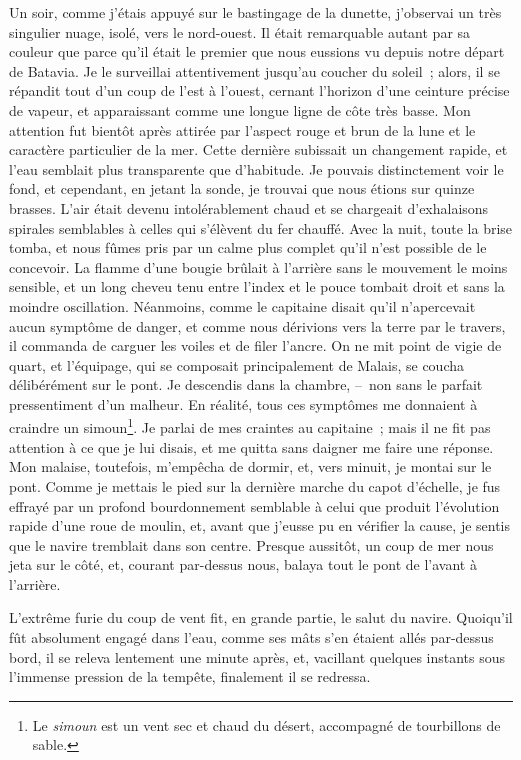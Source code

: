 \documentclass[french,twoside]{book} %
\begin{document}
Un soir, comme j’étais appuyé sur le bastingage de la dunette, j’observai un très singulier nuage, isolé, vers le nord-ouest. Il était remarquable autant par sa couleur que parce qu’il était le premier que nous eussions vu depuis notre départ de Batavia. Je le surveillai attentivement jusqu’au coucher du soleil ; alors, il se répandit tout d’un coup de l’est à l’ouest, cernant l’horizon d’une ceinture précise de vapeur, et apparaissant comme une longue ligne de côte très basse. Mon attention fut bientôt après attirée par l’aspect rouge et brun de la lune et le caractère particulier de la mer. Cette dernière subissait un changement rapide, et l’eau semblait plus transparente que d’habitude. Je pouvais distinctement voir le fond, et cependant, en jetant la sonde, je trouvai que nous étions sur quinze brasses. L’air était devenu intolérablement chaud et se chargeait d’exhalaisons spirales semblables à celles qui s’élèvent du fer chauffé. Avec la nuit, toute la brise tomba, et nous fûmes pris par un calme plus complet qu’il n’est possible de le concevoir. La flamme d’une bougie brûlait à l’arrière sans le mouvement le moins sensible, et un long cheveu tenu entre l’index et le pouce tombait droit et sans la moindre oscillation. Néanmoins, comme le capitaine disait qu’il n’apercevait aucun symptôme de danger, et comme nous dérivions vers la terre par le travers, il commanda de carguer les voiles et de filer l’ancre. On ne mit point de vigie de quart, et l’équipage, qui se composait principalement de Malais, se coucha délibérément sur le pont. Je descendis dans la chambre, – non sans le parfait pressentiment d’un malheur. En réalité, tous ces symptômes me donnaient à craindre un simoun\footnote{Le \emph{simoun} est un vent sec et chaud du désert, accompagné de tourbillons de sable.}. Je parlai de mes craintes au capitaine ; mais il ne fit pas attention à ce que je lui disais, et me quitta sans daigner me faire une réponse. Mon malaise, toutefois, m’empêcha de dormir, et, vers minuit, je montai sur le pont. Comme je mettais le pied sur la dernière marche du capot d’échelle, je fus effrayé par un profond bourdonnement semblable à celui que produit l’évolution rapide d’une roue de moulin, et, avant que j’eusse pu en vérifier la cause, je sentis que le navire tremblait dans son centre. Presque aussitôt, un coup de mer nous jeta sur le côté, et, courant par-dessus nous, balaya tout le pont de l’avant à l’arrière.\par
L’extrême furie du coup de vent fit, en grande partie, le salut du navire. Quoiqu’il fût absolument engagé dans l’eau, comme ses mâts s’en étaient allés par-dessus bord, il se releva lentement une minute après, et, vacillant quelques instants sous l’immense pression de la tempête, finalement il se redressa.\par
\end{document}
